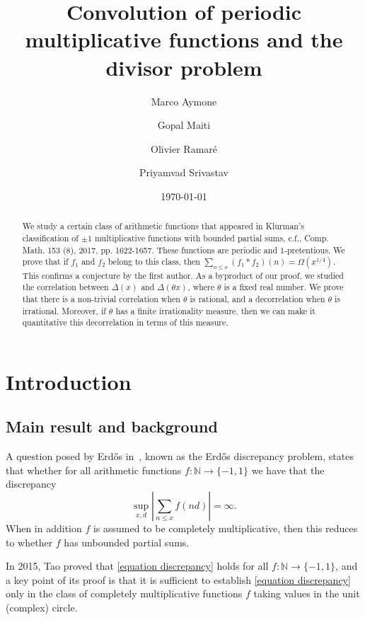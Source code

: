 \documentclass[a4paper,12pt, reqn0]{amsart}
\title{Convolution of periodic multiplicative functions and the divisor problem}
\author{Marco Aymone}
\author{Gopal Maiti}
\author{Olivier Ramar\'e}
\author{Priyamvad Srivastav}
\date{\today}
\theoremstyle{remark}
\newcommand{\NN}{\mathds{N}}
\begin{document}
\begin{abstract} 
We study a certain class of arithmetic functions that appeared in Klurman's classification of $\pm 1$ multiplicative functions with bounded partial sums, c.f., Comp. Math. 153 (8), 2017, pp. 1622-1657. These functions are periodic and $1$-pretentious. We
prove that if $f_1$ and $f_2$ belong to this class, then $\sum_{n\leq x}(f_1\ast f_2)(n)=\Omega(x^{1/4})$. This confirms a conjecture by the first author. As a byproduct of our proof, we studied the correlation between $\Delta(x)$ and $\Delta(\theta x)$, where $\theta$ is a fixed real number. We prove that there is a non-trivial correlation when
$\theta$ is rational, and a decorrelation when $\theta$ is irrational. Moreover,
if $\theta$ has a finite irrationality measure, then we can make it
quantitative this decorrelation in terms of this measure.
\end{abstract}

\maketitle
\section{Introduction}
\subsection{Main result and background} A question posed by Erd\H{o}s
in~\cite{erdos_unsolved}, known as the Erd\H{o}s discrepancy problem,
states that whether for all arithmetic functions $f:\NN\to\{-1,1\}$ we
have that the discrepancy
\begin{equation}\label{equation discrepancy}
\sup_{x,d}\left|\sum_{n\leq x}f(nd)\right|=\infty.
\end{equation}
When in addition $f$ is assumed to be completely multiplicative, then
this reduces to whether $f$ has unbounded partial sums.

In 2015, Tao \cite{tao_discrepancy} proved that \eqref{equation
  discrepancy} holds for all $f:\NN\to\{-1,1\}$, and a key point of
its proof is that it is sufficient to establish \eqref{equation
  discrepancy} only in the class of completely multiplicative
functions $f$ taking values in the unit (complex) circle.
\end{document}
